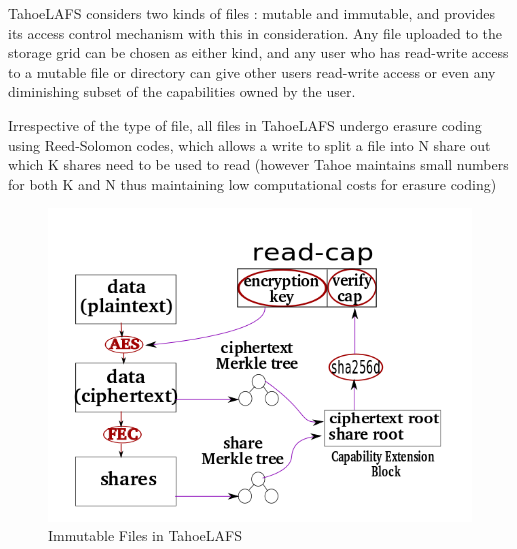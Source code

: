TahoeLAFS\cite{tahoelafs} considers two kinds of files : mutable and immutable, and provides its access control mechanism with this in consideration. Any file uploaded to the storage grid can be chosen as either kind, and any user who has read-write access to a mutable file or directory can give other users read-write access or even any diminishing subset of the capabilities owned by the user. 

Irrespective of the type of file, all files in TahoeLAFS undergo erasure coding using Reed-Solomon codes, which allows a write to split a file into N share out which K shares need to be used to read (however Tahoe maintains small numbers for both K and N thus maintaining low computational costs for erasure coding)

\begin{figure}[h]
\centering
\includegraphics[scale = 0.2]{img/immutable}
\caption{Immutable Files in TahoeLAFS}
\label{immutable}
\end{figure}

